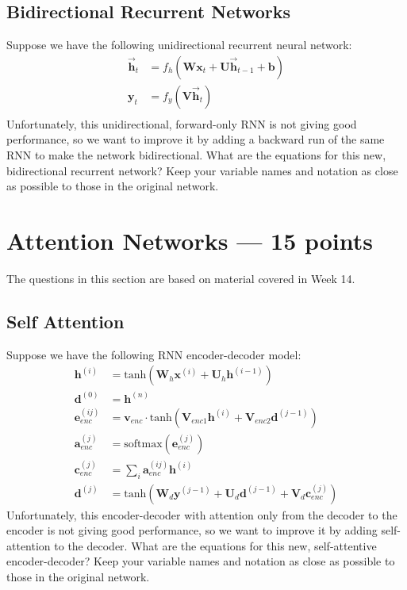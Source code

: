 \documentclass[12pt,a4paper]{article}
\begin{document}
\subsection{Bidirectional Recurrent Networks}

Suppose we have the following unidirectional recurrent neural network:
\begin{align*}
\overrightarrow{\mathbf{h}}_t &= f_h(\mathbf{W} \mathbf{x}_t + \mathbf{U} \overrightarrow{\mathbf{h}}_{t-1} + \mathbf{b}) \\
\mathbf{y}_t &= f_y(\mathbf{V} \mathbf{\overrightarrow{h}}_t) \\
\end{align*}
Unfortunately, this unidirectional, forward-only RNN is not giving good performance, so we want to improve it by adding a backward run of the same RNN to make the network bidirectional. What are the equations for this new, bidirectional recurrent network? Keep your variable names and notation as close as possible to those in the original network.

\section{Attention Networks --- 15 points}

The questions in this section are based on material covered in Week 14.

\subsection{Self Attention}

Suppose we have the following RNN encoder-decoder model:
\begin{align*}
\mathbf{h}^{(i)} &= \text{tanh}(\mathbf{W}_h \mathbf{x}^{(i)} + \mathbf{U}_h \mathbf{h}^{(i-1)}) \\
\mathbf{d}^{(0)} &= \mathbf{h}^{(n)} \\
\mathbf{e}_{enc}^{(ij)} &= \mathbf{v}_{enc} \cdot \text{tanh}(\mathbf{V}_{enc1} \mathbf{h}^{(i)} + \mathbf{V}_{enc2} \mathbf{d}^{(j-1)}) \\
\mathbf{a}_{enc}^{(j)} &= \text{softmax}(\mathbf{e}_{enc}^{(j)}) \\
\mathbf{c}_{enc}^{(j)} &= \sum_i \mathbf{a}_{enc}^{(ij)} \mathbf{h}^{(i)} \\
\mathbf{d}^{(j)} &= \text{tanh}(\mathbf{W}_d \mathbf{y}^{(j-1)} + \mathbf{U}_d \mathbf{d}^{(j-1)} + \mathbf{V}_d \mathbf{c}_{enc}^{(j)})
\end{align*}
Unfortunately, this encoder-decoder with attention only from the decoder to the encoder is not giving good performance, so we want to improve it by adding self-attention to the decoder. What are the equations for this new, self-attentive encoder-decoder? Keep your variable names and notation as close as possible to those in the original network.
\end{document}
